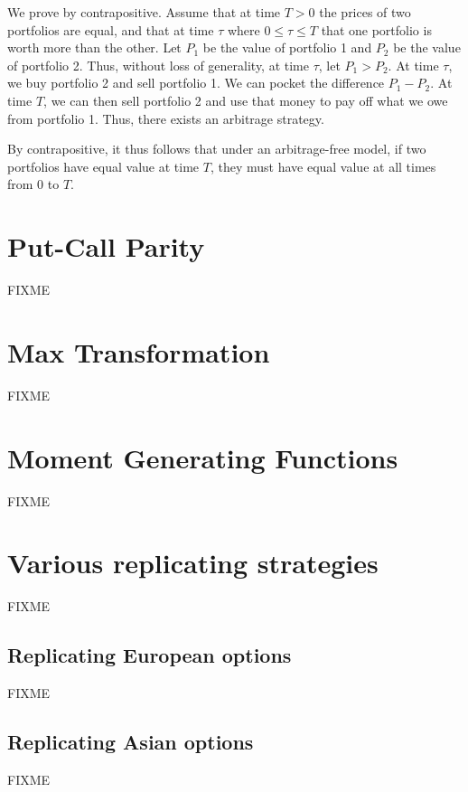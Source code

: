 \documentclass[reqno]{amsart}
\begin{document}
We prove by contrapositive. Assume that at time $T > 0$ the prices of two portfolios are equal, and that at time $\tau$ where $0 \leq \tau \leq T$ that one portfolio is worth more than the other. 
Let $P_1$ be the value of portfolio 1 and $P_2$ be the value of portfolio 2. Thus, without loss of generality, at time $\tau$, let $P_1 > P_2$.
At time $\tau$, we buy portfolio 2 and sell portfolio 1. We can pocket the difference $P_1 - P_2$. At time $T$, we can then sell portfolio 2 and use that money to pay off what we owe from portfolio 1. 
Thus, there exists an arbitrage strategy.

By contrapositive, it thus follows that under an arbitrage-free model, if two portfolios have equal value at time $T$, they must have equal value at all times from $0$ to $T$.

\section{Put-Call Parity}
FIXME
\section{Max Transformation}
FIXME
\section{Moment Generating Functions}
FIXME
\section{Various replicating strategies}
FIXME
\subsection{Replicating European options}
FIXME
\subsection{Replicating Asian options}
FIXME


\end{document}
